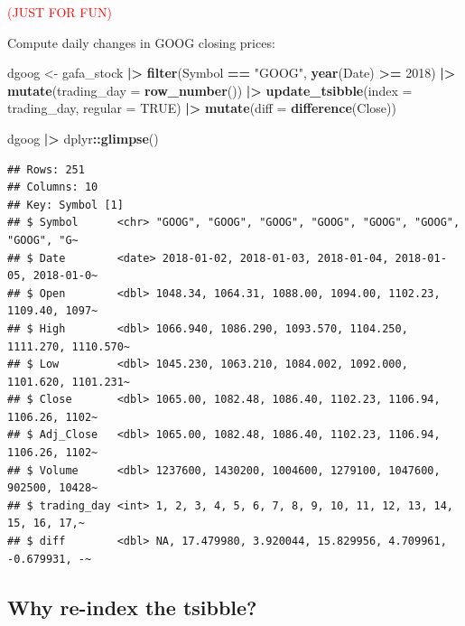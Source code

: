 \documentclass[
  11pt,
]{article}
\newenvironment{Shaded}{\begin{snugshade}}{\end{snugshade}}
\newcommand{\AttributeTok}[1]{\textcolor[rgb]{0.13,0.29,0.53}{#1}}
\newcommand{\ConstantTok}[1]{\textcolor[rgb]{0.56,0.35,0.01}{#1}}
\newcommand{\DecValTok}[1]{\textcolor[rgb]{0.00,0.00,0.81}{#1}}
\newcommand{\FunctionTok}[1]{\textcolor[rgb]{0.13,0.29,0.53}{\textbf{#1}}}
\newcommand{\NormalTok}[1]{#1}
\newcommand{\OtherTok}[1]{\textcolor[rgb]{0.56,0.35,0.01}{#1}}
\newcommand{\SpecialCharTok}[1]{\textcolor[rgb]{0.81,0.36,0.00}{\textbf{#1}}}
\newcommand{\StringTok}[1]{\textcolor[rgb]{0.31,0.60,0.02}{#1}}
\begin{document}
\textcolor{red}{(JUST FOR FUN)}

Compute daily changes in GOOG closing prices:

\begin{Shaded}
\begin{Highlighting}[]
\NormalTok{dgoog }\OtherTok{\textless{}{-}}\NormalTok{ gafa\_stock }\SpecialCharTok{|\textgreater{}}
  \FunctionTok{filter}\NormalTok{(Symbol }\SpecialCharTok{==} \StringTok{"GOOG"}\NormalTok{, }\FunctionTok{year}\NormalTok{(Date) }\SpecialCharTok{\textgreater{}=} \DecValTok{2018}\NormalTok{) }\SpecialCharTok{|\textgreater{}}
  \FunctionTok{mutate}\NormalTok{(}\AttributeTok{trading\_day =} \FunctionTok{row\_number}\NormalTok{()) }\SpecialCharTok{|\textgreater{}}
  \FunctionTok{update\_tsibble}\NormalTok{(}\AttributeTok{index =}\NormalTok{ trading\_day, }\AttributeTok{regular =} \ConstantTok{TRUE}\NormalTok{) }\SpecialCharTok{|\textgreater{}}
  \FunctionTok{mutate}\NormalTok{(}\AttributeTok{diff =} \FunctionTok{difference}\NormalTok{(Close))}

\NormalTok{dgoog }\SpecialCharTok{|\textgreater{}}\NormalTok{ dplyr}\SpecialCharTok{::}\FunctionTok{glimpse}\NormalTok{()}
\end{Highlighting}
\end{Shaded}

\begin{verbatim}
## Rows: 251
## Columns: 10
## Key: Symbol [1]
## $ Symbol      <chr> "GOOG", "GOOG", "GOOG", "GOOG", "GOOG", "GOOG", "GOOG", "G~
## $ Date        <date> 2018-01-02, 2018-01-03, 2018-01-04, 2018-01-05, 2018-01-0~
## $ Open        <dbl> 1048.34, 1064.31, 1088.00, 1094.00, 1102.23, 1109.40, 1097~
## $ High        <dbl> 1066.940, 1086.290, 1093.570, 1104.250, 1111.270, 1110.570~
## $ Low         <dbl> 1045.230, 1063.210, 1084.002, 1092.000, 1101.620, 1101.231~
## $ Close       <dbl> 1065.00, 1082.48, 1086.40, 1102.23, 1106.94, 1106.26, 1102~
## $ Adj_Close   <dbl> 1065.00, 1082.48, 1086.40, 1102.23, 1106.94, 1106.26, 1102~
## $ Volume      <dbl> 1237600, 1430200, 1004600, 1279100, 1047600, 902500, 10428~
## $ trading_day <int> 1, 2, 3, 4, 5, 6, 7, 8, 9, 10, 11, 12, 13, 14, 15, 16, 17,~
## $ diff        <dbl> NA, 17.479980, 3.920044, 15.829956, 4.709961, -0.679931, -~
\end{verbatim}

\subsection{Why re-index the tsibble?}\label{why-re-index-the-tsibble}
\end{document}

